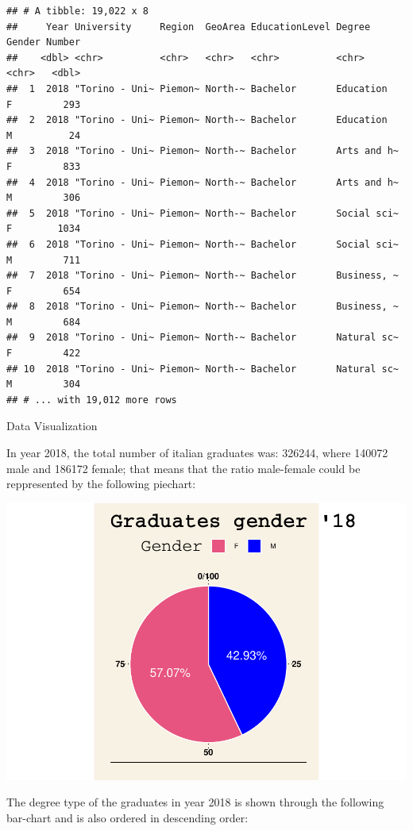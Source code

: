 \documentclass[
]{article}
\begin{document}
\begin{verbatim}
## # A tibble: 19,022 x 8
##     Year University     Region  GeoArea EducationLevel Degree      Gender Number
##    <dbl> <chr>          <chr>   <chr>   <chr>          <chr>       <chr>   <dbl>
##  1  2018 "Torino - Uni~ Piemon~ North-~ Bachelor       Education   F         293
##  2  2018 "Torino - Uni~ Piemon~ North-~ Bachelor       Education   M          24
##  3  2018 "Torino - Uni~ Piemon~ North-~ Bachelor       Arts and h~ F         833
##  4  2018 "Torino - Uni~ Piemon~ North-~ Bachelor       Arts and h~ M         306
##  5  2018 "Torino - Uni~ Piemon~ North-~ Bachelor       Social sci~ F        1034
##  6  2018 "Torino - Uni~ Piemon~ North-~ Bachelor       Social sci~ M         711
##  7  2018 "Torino - Uni~ Piemon~ North-~ Bachelor       Business, ~ F         654
##  8  2018 "Torino - Uni~ Piemon~ North-~ Bachelor       Business, ~ M         684
##  9  2018 "Torino - Uni~ Piemon~ North-~ Bachelor       Natural sc~ F         422
## 10  2018 "Torino - Uni~ Piemon~ North-~ Bachelor       Natural sc~ M         304
## # ... with 19,012 more rows
\end{verbatim}

Data Visualization

In year 2018, the total number of italian graduates was: 326244, where
140072 male and 186172 female; that means that the ratio male-female
could be reppresented by the following piechart:

\includegraphics{g_gap_stem_files/figure-latex/unnamed-chunk-3-1.pdf}

The degree type of the graduates in year 2018 is shown through the
following bar-chart and is also ordered in descending order:
\end{document}
